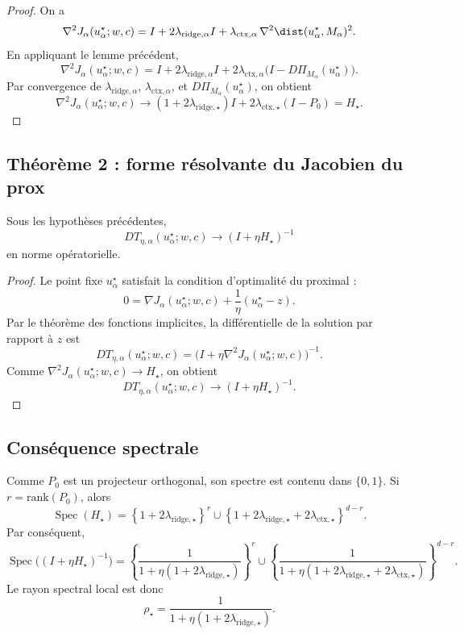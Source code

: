 \begin{proof}
On a
\[
\nabla^2 J_\alpha(u_\alpha^\star;w,c)
=
I
+
2\lambda_{\mathrm{ridge},\alpha}I
+
\lambda_{\mathrm{ctx},\alpha}\,\nabla^2 \dist(u_\alpha^\star,M_\alpha)^2.
\]
En appliquant le lemme précédent,
\[
\nabla^2 J_\alpha(u_\alpha^\star;w,c)
=
I
+
2\lambda_{\mathrm{ridge},\alpha}I
+
2\lambda_{\mathrm{ctx},\alpha}\bigl(I-D\Pi_{M_\alpha}(u_\alpha^\star)\bigr).
\]
Par convergence de \(\lambda_{\mathrm{ridge},\alpha}\), \(\lambda_{\mathrm{ctx},\alpha}\), et \(D\Pi_{M_\alpha}(u_\alpha^\star)\), on obtient
\[
\nabla^2 J_\alpha(u_\alpha^\star;w,c)
\to
(1+2\lambda_{\mathrm{ridge},\star})I
+
2\lambda_{\mathrm{ctx},\star}(I-P_0)
=
H_\star.
\]
\end{proof}

\subsection{Théorème 2 : forme résolvante du Jacobien du prox}

\begin{theorem}
Sous les hypothèses précédentes,
\[
DT_{\eta,\alpha}(u_\alpha^\star;w,c)
\longrightarrow
(I+\eta H_\star)^{-1}
\]
en norme opératorielle.
\end{theorem}

\begin{proof}
Le point fixe \(u_\alpha^\star\) satisfait la condition d'optimalité du proximal :
\[
0
=
\nabla J_\alpha(u_\alpha^\star;w,c)
+
\frac1\eta(u_\alpha^\star-z).
\]
Par le théorème des fonctions implicites, la différentielle de la solution par rapport à \(z\) est
\[
DT_{\eta,\alpha}(u_\alpha^\star;w,c)
=
\bigl(I+\eta \nabla^2 J_\alpha(u_\alpha^\star;w,c)\bigr)^{-1}.
\]
Comme \(\nabla^2 J_\alpha(u_\alpha^\star;w,c)\to H_\star\), on obtient
\[
DT_{\eta,\alpha}(u_\alpha^\star;w,c)
\to
(I+\eta H_\star)^{-1}.
\]
\end{proof}

\subsection{Conséquence spectrale}

Comme \(P_0\) est un projecteur orthogonal, son spectre est contenu dans \(\{0,1\}\). Si \(r=\mathrm{rank}(P_0)\), alors
\[
\operatorname{Spec}(H_\star)
=
\left\{1+2\lambda_{\mathrm{ridge},\star}\right\}^{r}
\cup
\left\{1+2\lambda_{\mathrm{ridge},\star}+2\lambda_{\mathrm{ctx},\star}\right\}^{d-r}.
\]
Par conséquent,
\[
\operatorname{Spec}\bigl((I+\eta H_\star)^{-1}\bigr)
=
\left\{
\frac{1}{1+\eta(1+2\lambda_{\mathrm{ridge},\star})}
\right\}^{r}
\cup
\left\{
\frac{1}{1+\eta(1+2\lambda_{\mathrm{ridge},\star}+2\lambda_{\mathrm{ctx},\star})}
\right\}^{d-r}.
\]
Le rayon spectral local est donc
\[
\rho_\star
=
\frac{1}{1+\eta(1+2\lambda_{\mathrm{ridge},\star})}.
\]

